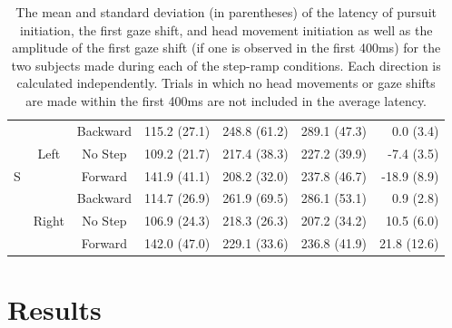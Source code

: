 \documentclass[12pt]{article}
\begin{document}
\begin{table}[h]
{\begin{tabular}{@{}ccccccr@{}}
        & \cellcolor[HTML]{EFEFEF}     & \cellcolor[HTML]{EFEFEF}Backward & \cellcolor[HTML]{EFEFEF}115.2 (27.1) & \cellcolor[HTML]{EFEFEF}248.8 (61.2) & \cellcolor[HTML]{EFEFEF}289.1 (47.3) & \cellcolor[HTML]{EFEFEF}0.0 (3.4)                                                   \\
        & \cellcolor[HTML]{EFEFEF}Left & \cellcolor[HTML]{EFEFEF}No Step  & \cellcolor[HTML]{EFEFEF}109.2 (21.7) & \cellcolor[HTML]{EFEFEF}217.4 (38.3) & \cellcolor[HTML]{EFEFEF}227.2 (39.9) & \cellcolor[HTML]{EFEFEF}-7.4 (3.5)                                                  \\
S       & \cellcolor[HTML]{EFEFEF}     & \cellcolor[HTML]{EFEFEF}Forward  & \cellcolor[HTML]{EFEFEF}141.9 (41.1) & \cellcolor[HTML]{EFEFEF}208.2 (32.0) & \cellcolor[HTML]{EFEFEF}237.8 (46.7) & \cellcolor[HTML]{EFEFEF}-18.9 (8.9)                                                 \\
        &                              & Backward                         & 114.7 (26.9)                         & 261.9 (69.5)                         & 286.1 (53.1)                         & 0.9 (2.8)                                                                           \\
        & Right                        & No Step                          & 106.9 (24.3)                         & 218.3 (26.3)                         & 207.2 (34.2)                         & 10.5 (6.0)                                                                          \\
        &                              & Forward                          & 142.0 (47.0)                         & 229.1 (33.6)                         & 236.8 (41.9)                         & 21.8 (12.6)                                                                         \\ \bottomrule
\end{tabular}
}
\caption[Latency during Step Ramp]{The mean and standard deviation (in parentheses) of the latency of pursuit initiation, the first gaze shift, and head movement initiation as well as the amplitude of the first gaze shift (if one is observed in the first 400ms) for the two subjects made during each of the step-ramp conditions. Each direction is calculated independently. Trials in which no head movements or gaze shifts are made within the first 400ms are not included in the average latency.}
\label{tab:StepRamp}
\end{table}

\section{Results}
\end{document}
